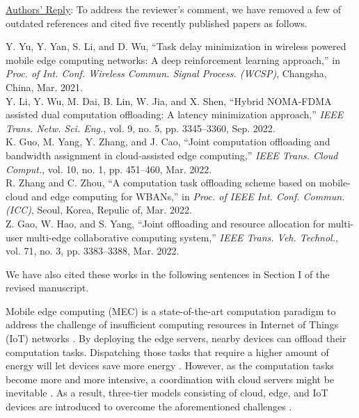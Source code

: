 \documentclass[12pt,draftclsnofoot,onecolumn]{IEEEtran}
\newcommand{\rev}[1]{{\color{blue}#1}} %
\newcommand{\rev}[1]{#1}
\newenvironment{my}[2]%
{\begin{list}{}%
{\setlength{\rightmargin}{#1}\setlength{\leftmargin}{#2}}%


 \item[]{}

} {\end{list}}
\begin{document}
\begin{enumerate}
	\underline{Authors' Reply}: To address the reviewer's comment, we have removed a few of outdated references and cited five recently published papers as follows. \newline
	\begin{my}{1cm}{1cm}
		\rev{
	{\small
		\noindent\cite{b35} Y. Yu, Y. Yan, S. Li, and D. Wu, ``Task delay minimization in wireless powered mobile edge computing networks: A deep reinforcement learning approach,'' in \textit{Proc. of Int. Conf. Wireless Commun. Signal Process. (WCSP)}, Changsha, China, Mar. 2021.\\[10pt]
		\cite{b38} Y. Li, Y. Wu, M. Dai, B. Lin, W. Jia, and X. Shen, ``Hybrid NOMA-FDMA assisted dual computation offloading: A latency minimization approach,'' \textit{IEEE Trans. Netw. Sci. Eng.}, vol. 9, no. 5, pp. 3345--3360, Sep. 2022.\\[10pt]
		\cite{b37} K. Guo, M. Yang, Y. Zhang, and J. Cao, ``Joint computation offloading and bandwidth assignment in cloud-assisted edge computing,'' \textit{IEEE Trans. Cloud Comput.}, vol. 10, no. 1, pp. 451--460, Mar. 2022.\\[10pt]
		\cite{b39} R. Zhang and C. Zhou, ``A computation task offloading scheme based on mobile-cloud and edge computing for WBANs,'' in \textit{Proc. of IEEE Int. Conf.	Commun. (ICC)}, Seoul, Korea, Repulic of, Mar. 2022.\\[10pt]
		\cite{b40} Z. Gao, W. Hao, and S. Yang, ``Joint offloading and resource allocation for multi-user multi-edge collaborative computing system,'' \textit{IEEE Trans. Veh. Technol.}, vol. 71, no. 3, pp. 3383--3388, Mar. 2022.}\\}
	\end{my}

	We have also cited these works in the following sentences in Section I of the revised manuscript.\\
	
	\begin{my}{1cm}{1cm}
		\rev{
			Mobile edge computing (MEC) is a state-of-the-art computation paradigm to address the challenge of insufficient computing resources in Internet of Things (IoT) networks \cite{b35, b4}. By deploying the edge servers, nearby devices can offload their computation tasks. Dispatching those tasks that require a higher amount of energy will let devices save more energy \cite{b38}. However, as the computation tasks become more and more intensive, a coordination with cloud servers might be inevitable \cite{b37}. As a result, three-tier models consisting of cloud, edge, and IoT devices are introduced to overcome the aforementioned challenges \cite{b5,b6,b39,b40}.
			
}
\end{my}
\end{enumerate}
\end{document}
